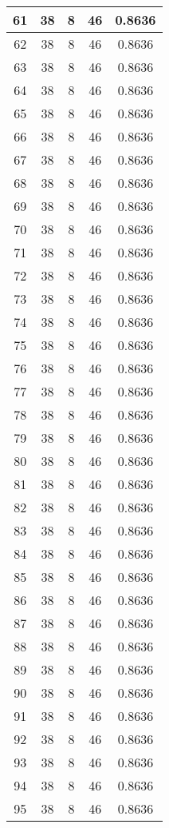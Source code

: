 \documentclass[letterpaper, 12pt]{article}
\begin{document}
\begin{longtable}{|c|c|c|c|c|}
61 & 38 & 8 & 46 & 0.8636 \\
\hline
62 & 38 & 8 & 46 & 0.8636 \\
\hline
63 & 38 & 8 & 46 & 0.8636 \\
\hline
64 & 38 & 8 & 46 & 0.8636 \\
\hline
65 & 38 & 8 & 46 & 0.8636 \\
\hline
66 & 38 & 8 & 46 & 0.8636 \\
\hline
67 & 38 & 8 & 46 & 0.8636 \\
\hline
68 & 38 & 8 & 46 & 0.8636 \\
\hline
69 & 38 & 8 & 46 & 0.8636 \\
\hline
70 & 38 & 8 & 46 & 0.8636 \\
\hline
71 & 38 & 8 & 46 & 0.8636 \\
\hline
72 & 38 & 8 & 46 & 0.8636 \\
\hline
73 & 38 & 8 & 46 & 0.8636 \\
\hline
74 & 38 & 8 & 46 & 0.8636 \\
\hline
75 & 38 & 8 & 46 & 0.8636 \\
\hline
76 & 38 & 8 & 46 & 0.8636 \\
\hline
77 & 38 & 8 & 46 & 0.8636 \\
\hline
78 & 38 & 8 & 46 & 0.8636 \\
\hline
79 & 38 & 8 & 46 & 0.8636 \\
\hline
80 & 38 & 8 & 46 & 0.8636 \\
\hline
81 & 38 & 8 & 46 & 0.8636 \\
\hline
82 & 38 & 8 & 46 & 0.8636 \\
\hline
83 & 38 & 8 & 46 & 0.8636 \\
\hline
84 & 38 & 8 & 46 & 0.8636 \\
\hline
85 & 38 & 8 & 46 & 0.8636 \\
\hline
86 & 38 & 8 & 46 & 0.8636 \\
\hline
87 & 38 & 8 & 46 & 0.8636 \\
\hline
88 & 38 & 8 & 46 & 0.8636 \\
\hline
89 & 38 & 8 & 46 & 0.8636 \\
\hline
90 & 38 & 8 & 46 & 0.8636 \\
\hline
91 & 38 & 8 & 46 & 0.8636 \\
\hline
92 & 38 & 8 & 46 & 0.8636 \\
\hline
93 & 38 & 8 & 46 & 0.8636 \\
\hline
94 & 38 & 8 & 46 & 0.8636 \\
\hline
95 & 38 & 8 & 46 & 0.8636 \\

\end{longtable}
\end{document}
